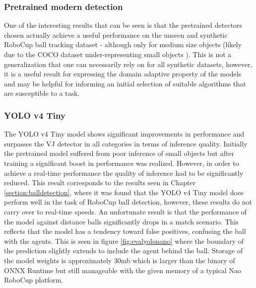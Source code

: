 \documentclass[a4paper,twoside,12pt]{report}
\begin{document}
\subsubsection{Pretrained modern detection}

One of the interesting results that can be seen is that the pretrained detectors chosen actually achieve a useful performance on the unseen and synthetic RoboCup ball tracking dataset - although only for medium size objects (likely due to the COCO dataset under-representing small objects \citep{smallcoco}). This is not a generalization that one can necessarily rely on for all synthetic datasets, however, it is a useful result for expressing the domain adaptive property of the models and may be helpful for informing an initial selection of suitable algorithms that are susceptible to a task.

\subsubsection{YOLO v4 Tiny}

The YOLO v4 Tiny model shows significant improvements in performance and surpasses the VJ detector in all categories in terms of inference quality. Initially the pretrained model suffered from poor inference of small objects but after training a significant boost in performance was realized. However, in order to achieve a real-time performance the quality of inference had to be significantly reduced. This result corresponds to the results seen in Chapter \ref{section:balldetection}, where it was found that the YOLO v4 Tiny model does perform well in the task of RoboCup ball detection, however, these results do not carry over to real-time speeds. An unfortunate result is that the performance of the model against distance balls significantly drops in a match scenario. This reflects that the model has a tendency toward false positives, confusing the ball with the agents. This is seen in figure \ref{fig:evalyolonano} where the boundary of the prediction slightly extends to include the agent behind the ball. Storage of the model weights is approximately 30mb which is larger than the binary of ONNX Runtime but still manageable with the given memory of a typical Nao RoboCup platform.
\end{document}
